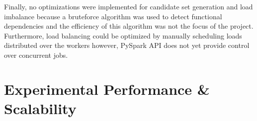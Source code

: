 \documentclass{article}
\begin{document}
        Finally, no optimizations were implemented for candidate set generation and load imbalance because a bruteforce algorithm was used to detect functional dependencies and the efficiency of this algorithm was not the focus of the project. Furthermore, load balancing could be optimized by manually scheduling loads distributed over the workers however, PySpark API does not yet provide control over concurrent jobs. 
    
        
        
        
\section{Experimental Performance \& Scalability}
\end{document}

